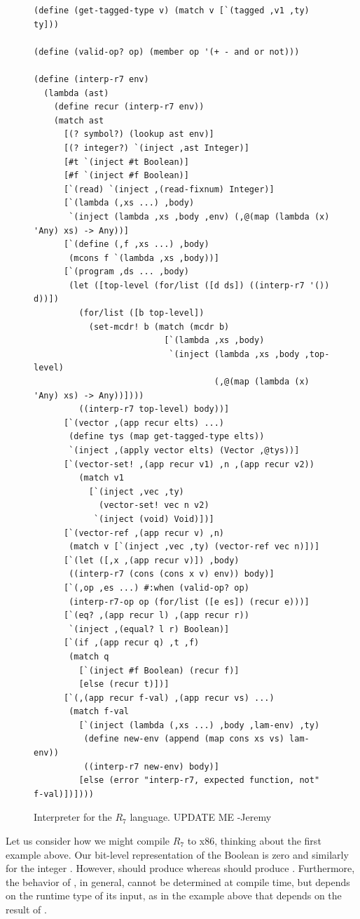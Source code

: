 \documentclass[11pt]{book}
\begin{document}
\begin{figure}[tbp]
\begin{lstlisting}[basicstyle=\ttfamily\footnotesize]
(define (get-tagged-type v) (match v [`(tagged ,v1 ,ty) ty]))

(define (valid-op? op) (member op '(+ - and or not)))

(define (interp-r7 env)
  (lambda (ast)
    (define recur (interp-r7 env))
    (match ast
      [(? symbol?) (lookup ast env)]
      [(? integer?) `(inject ,ast Integer)]
      [#t `(inject #t Boolean)]
      [#f `(inject #f Boolean)]
      [`(read) `(inject ,(read-fixnum) Integer)]
      [`(lambda (,xs ...) ,body)
       `(inject (lambda ,xs ,body ,env) (,@(map (lambda (x) 'Any) xs) -> Any))]
      [`(define (,f ,xs ...) ,body)
       (mcons f `(lambda ,xs ,body))]
      [`(program ,ds ... ,body)
       (let ([top-level (for/list ([d ds]) ((interp-r7 '()) d))])
         (for/list ([b top-level])
           (set-mcdr! b (match (mcdr b)
                          [`(lambda ,xs ,body)
                           `(inject (lambda ,xs ,body ,top-level)
                                    (,@(map (lambda (x) 'Any) xs) -> Any))])))
         ((interp-r7 top-level) body))]
      [`(vector ,(app recur elts) ...)
       (define tys (map get-tagged-type elts))
       `(inject ,(apply vector elts) (Vector ,@tys))]
      [`(vector-set! ,(app recur v1) ,n ,(app recur v2))
         (match v1
           [`(inject ,vec ,ty)
             (vector-set! vec n v2)
            `(inject (void) Void)])]
      [`(vector-ref ,(app recur v) ,n)
       (match v [`(inject ,vec ,ty) (vector-ref vec n)])]
      [`(let ([,x ,(app recur v)]) ,body)
       ((interp-r7 (cons (cons x v) env)) body)]
      [`(,op ,es ...) #:when (valid-op? op)
       (interp-r7-op op (for/list ([e es]) (recur e)))]
      [`(eq? ,(app recur l) ,(app recur r))
       `(inject ,(equal? l r) Boolean)]
      [`(if ,(app recur q) ,t ,f)
       (match q
         [`(inject #f Boolean) (recur f)]
         [else (recur t)])]
      [`(,(app recur f-val) ,(app recur vs) ...)
       (match f-val
         [`(inject (lambda (,xs ...) ,body ,lam-env) ,ty)
          (define new-env (append (map cons xs vs) lam-env))
          ((interp-r7 new-env) body)]
         [else (error "interp-r7, expected function, not" f-val)])])))
\end{lstlisting}
\caption{Interpreter for the $R_7$ language. UPDATE ME -Jeremy}
\label{fig:interp-R7}
\end{figure}


Let us consider how we might compile $R_7$ to x86, thinking about the
first example above. Our bit-level representation of the Boolean
 is zero and similarly for the integer .  However,
 should produce  whereas 
should produce . Furthermore, the behavior of , in
general, cannot be determined at compile time, but depends on the
runtime type of its input, as in the example above that depends on the
result of .
\end{document}
